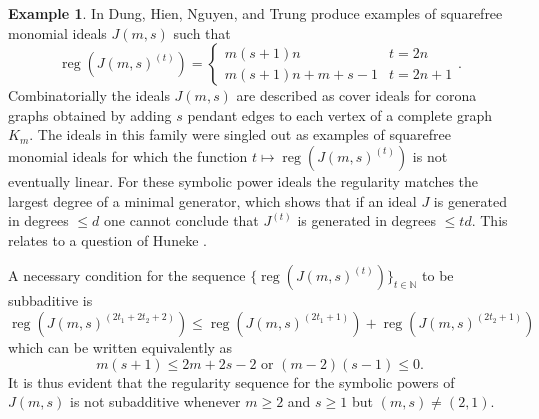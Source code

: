 \documentclass[12pt, reqno]{amsart}
\numberwithin{equation}{section}
\newcommand{\N}{{\mathbb N}}
\DeclareMathOperator{\reg}{reg}
\theoremstyle{plain} %
\theoremstyle{definition}
\newtheorem{ex}[thm]{Example}
\theoremstyle{remark}
\begin{document}
 \begin{ex}
 \label{ex:nonsubreg}
 In \cite[Theorem 5.15]{DHNT21} Dung, Hien, Nguyen, and Trung produce examples of squarefree monomial ideals $J(m,s)$ such that 
 \[
 \reg \left(J(m,s)^{(t)}\right)=
 \begin{cases}
 m(s + 1)n & t=2n\\
 m(s + 1)n + m + s - 1 &t=2n+1
 \end{cases}.
 \]
 Combinatorially the ideals $J(m,s)$ are described as cover ideals for corona graphs obtained by adding $s$ pendant edges to each vertex of a complete graph $K_m$. The ideals in this family were singled out as examples of squarefree monomial ideals for which the function $t\mapsto \reg(J(m,s)^{(t)})$ is not eventually linear. For these symbolic power ideals the regularity matches the largest degree of a minimal generator, which shows that if an ideal $J$ is generated in degrees $\leq d$ one cannot conclude that $J^{(t)}$ is generated in degrees $\leq td$. This relates to a question of Huneke \cite[Problem 0.4]{HunekeAIM}.

 
 A necessary condition for the sequence $\{\reg(J(m,s)^{(t)})\}_{t\in\N}$ to be subbaditive is
 \[
\reg(J(m,s)^{(2t_1+2t_2+2)}) \leq\reg(J(m,s)^{(2t_1+1)})+ \reg(J(m,s)^{(2t_2+1)})
 \]
 which can be written equivalently as
 \[
 m(s+1)\leq 2m+2s-2 \text{ or } (m-2)(s-1)\leq 0.
 \]
 It is thus evident that the regularity sequence for the symbolic powers of $J(m,s)$ is not subadditive whenever $m\geq 2$ and $s\geq 1$ but $(m,s)\neq(2,1)$. 
 \end{ex}
 
\end{document}
